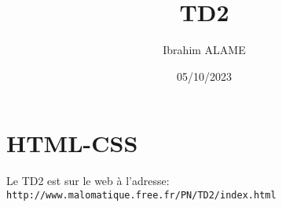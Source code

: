 \documentclass[a4paper]{article}
\title{TD2}
\author{Ibrahim ALAME}
\date{05/10/2023}
\begin{document}
\maketitle
\section*{HTML-CSS}%
Le TD2 est sur le web à l'adresse:  {\tt http://www.malomatique.free.fr/PN/TD2/index.html}
\end{document}
